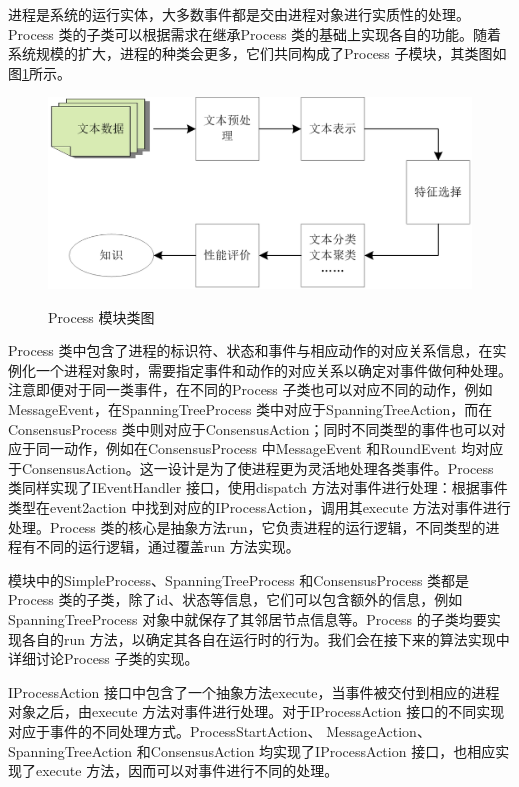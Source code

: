     进程是系统的运行实体，大多数事件都是交由进程对象进行实质性的处理。Process 类的子类可以根据需求在继承Process 类的基础上实现各自的功能。随着系统规模的扩大，进程的种类会更多，它们共同构成了Process 子模块，其类图如图\ref{Process}所示。
    \begin{figure}[ht]
        \centering
        \includegraphics[width=14cm]{Process}\\
        \caption{Process 模块类图}\label{Process}
    \end{figure}
            
    Process 类中包含了进程的标识符、状态和事件与相应动作的对应关系信息，在实例化一个进程对象时，需要指定事件和动作的对应关系以确定对事件做何种处理。注意即便对于同一类事件，在不同的Process 子类也可以对应不同的动作，例如MessageEvent，在SpanningTreeProcess 类中对应于SpanningTreeAction，而在ConsensusProcess 类中则对应于ConsensusAction；同时不同类型的事件也可以对应于同一动作，例如在ConsensusProcess 中MessageEvent 和RoundEvent 均对应于ConsensusAction。这一设计是为了使进程更为灵活地处理各类事件。Process 类同样实现了IEventHandler 接口，使用dispatch 方法对事件进行处理：根据事件类型在event2action 中找到对应的IProcessAction，调用其execute 方法对事件进行处理。Process 类的核心是抽象方法run，它负责进程的运行逻辑，不同类型的进程有不同的运行逻辑，通过覆盖run 方法实现。
          
    模块中的SimpleProcess、SpanningTreeProcess 和ConsensusProcess 类都是Process 类的子类，除了id、状态等信息，它们可以包含额外的信息，例如SpanningTreeProcess 对象中就保存了其邻居节点信息等。Process 的子类均要实现各自的run 方法，以确定其各自在运行时的行为。我们会在接下来的算法实现中详细讨论Process 子类的实现。
          
    IProcessAction 接口中包含了一个抽象方法execute，当事件被交付到相应的进程对象之后，由execute 方法对事件进行处理。对于IProcessAction 接口的不同实现对应于事件的不同处理方式。ProcessStartAction、 MessageAction、 SpanningTreeAction 和ConsensusAction 均实现了IProcessAction 接口，也相应实现了execute 方法，因而可以对事件进行不同的处理。
    
